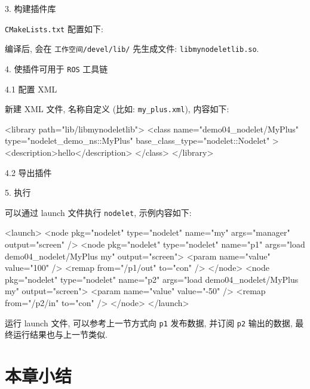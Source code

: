 \documentclass[openany, fontset=windowsold]{ctexbook}
\theoremstyle{kaiti}
\theoremstyle{normal}
\begin{document}
3. 构建插件库

\verb|CMakeLists.txt| 配置如下: 


编译后, 会在 \verb|工作空间/devel/lib/| 先生成文件: \verb|libmynodeletlib.so|.

4. 使插件可用于 \verb|ROS| 工具链

4.1 配置 XML

新建 XML 文件, 名称自定义 (比如: \verb|my_plus.xml|), 内容如下: 

\begin{xml}
  <library path="lib/libmynodeletlib">
      <class name="demo04_nodelet/MyPlus" type="nodelet_demo_ns::MyPlus" base_class_type="nodelet::Nodelet" >
          <description>hello</description>
      </class>
  </library>
\end{xml}

4.2 导出插件


5. 执行

可以通过 launch 文件执行 \verb|nodelet|, 示例内容如下:

\begin{xml}
  <launch>
      <node pkg="nodelet" type="nodelet" name="my" args="manager" output="screen" />
      <node pkg="nodelet" type="nodelet" name="p1" args="load demo04_nodelet/MyPlus my" output="screen">
          <param name="value" value="100" />
          <remap from="/p1/out" to="con" />
      </node>
      <node pkg="nodelet" type="nodelet" name="p2" args="load demo04_nodelet/MyPlus my" output="screen">
          <param name="value" value="-50" />
          <remap from="/p2/in" to="con" />
      </node>
  </launch>
\end{xml}

运行 launch 文件, 可以参考上一节方式向 \verb|p1| 发布数据, 并订阅 \verb|p2| 输出的数据, 最终运行结果也与上一节类似.

\section{本章小结}
\end{document}
